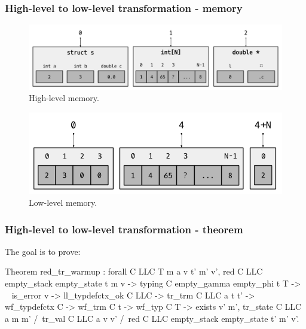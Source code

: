 \begin{frame}[fragile]
\frametitle{High-level to low-level transformation - memory}

\begin{center}

\begin{figure}
	\includegraphics[scale=0.31]{images/high_level_memory}
	\caption{High-level memory.}
\end{figure}

\begin{figure}
	\includegraphics[scale=0.31]{images/low_level_memory}
	\caption{Low-level memory.}
\end{figure}

\end{center}

\end{frame}

\begin{frame}[fragile]
\frametitle{High-level to low-level transformation - theorem}

The goal is to prove:
\begin{coq}
Theorem red_tr_warmup : forall C LLC T m a v t' m' v',
  red C LLC empty_stack empty_state t m v ->
  typing C empty_gamma empty_phi t T ->
  ~ is_error v ->
  ll_typdefctx_ok C LLC ->
  tr_trm C LLC a t t' ->
  wf_typdefctx C ->
  wf_trm C t ->
  wf_typ C T ->
  exists v' m',		tr_state C LLC a m m'
  		 /\ tr_val C LLC a v v'
  		 /\ red C LLC empty_stack empty_state t' m' v'.
\end{coq}

\end{frame}



